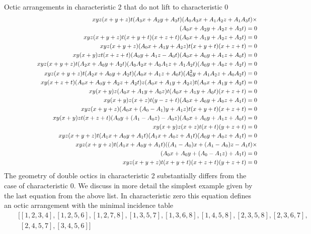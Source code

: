 \documentclass[12pt]{amsart}
\theoremstyle{plain}
\theoremstyle{remark}
\theoremstyle{definition}
\numberwithin{table}{section}
\begin{document}
Octic arrangements in characteristic 2 that do not lift to characteristic 0
\begin{eqnarray*}
	&&xyz(x+y+z)t(A_{3}x+A_{2}y+A_{3}t)(A_{0}A_{3}x+A_{1}A_{2}z+A_{1}A_{3}t)\times\\
	&&\rule{10cm}{0cm}(A_{0}x+A_{2}y+A_{2}z+A_{3}t)=0\\
	&&xyz(x+y+z)t(x+y+t)(x+z+t)(A_{0}x+A_{1}y+A_{2}z+A_{3}t)=0\\
	&&xyz(x+y+z)(A_{0}x+A_{1}y+A_{2}z)t(x+y+t)(x+z+t)=0\\
	&&xy(x+y)zt(x+z+t)(A_{0}y+A_{1}z-A_{0}t)(A_{0}x+A_{0}y+A_{1}z+A_{0}t)=0\\
	&&xyz(x+y+z)t(A_{2}x+A_{0}y+A_{2}t)(A_{0}A_{2}x+A_{0}A_{1}z+A_{1}A_{2}t)(A_{0}y+A_{0}z+A_{2}t)=0\\
&&xyz(x+y+z)t(A_{2}x+A_{0}y+A_{2}t)(A_{0}x+A_{1}z+A_{0}t)(A_{0}^{2}y+A_{1}A_{2}z+A_{0}A_{2}t)=0\\
	&&xy(x+z+t)(A_{0}x+A_{0}y+A_{2}z+A_{2}t)z(A_{0}x+A_{1}y+A_{2}z)t(A_{0}x+A_{1}y+A_{2}t)=0\\
	&&xy(x+y)z(A_{0}x+A_{1}y+A_{0}z)t(A_{0}x+A_{1}y+A_{0}t)(x+z+t)=0\\
	&&xy(x+y)z(x+z)t(y-z+t)(A_{0}x+A_{0}y+A_{0}z+A_{1}t)=0\\
	&&xyz(x+y+z)(A_{0}x+(A_{0}-A_{1})y+A_{1}z)t(x+y+t)(x+z+t)=0\\
	&&xy(x+y)zt(x+z+t)(A_{0}y+(A_{1}-A_{0}z)-A_{0}z)(A_{0}x+A_{0}y+A_{1}z+A_{0}t)=0\\
	&&xy(x+y)z(x+z)t(x+t)(y+z+t)=0\\
	&&xyz(x+y+z)t(A_{1}x+A_{0}y+A_{1}t)(A_{1}x+A_{0}z+A_{1}t)(A_{0}y+A_{0}z+A_{1}t)=0\\
	&&xyz(x+y+z)t(A_{1}x+A_{0}y+A_{1}t)((A_{1}-A_{0})x+(A_{1}-A_{0})z-A_{1}t)\times\\
	&&\rule{8.6cm}{0cm}(A_{0}x+A_{0}y+(A_{0}-A_{1}z)+A_{1}t)=0\\
	&&xyz(x+y+z)t(x+y+t)(x+z+t)(y+z+t)=0
\end{eqnarray*}
The geometry of double octics in characteristic 2 substantially differs from the case of characteristic 0. We discuss in more detail the simplest example given by the last equation from the above list. In characteristic zero this equation defines an octic arrangement with the minimal incidence table
\begin{eqnarray*}
	&&[[1,2,3,4], [1,2,5,6], [1,2,7,8], [1,3,5,7], [1,3,6,8], [1,4,5,8], [2,3,5,8], [2,3,6,7],\\ &&\phantom{[}[2,4,5,7], [3,4,5,6]]
\end{eqnarray*}
\end{document}
